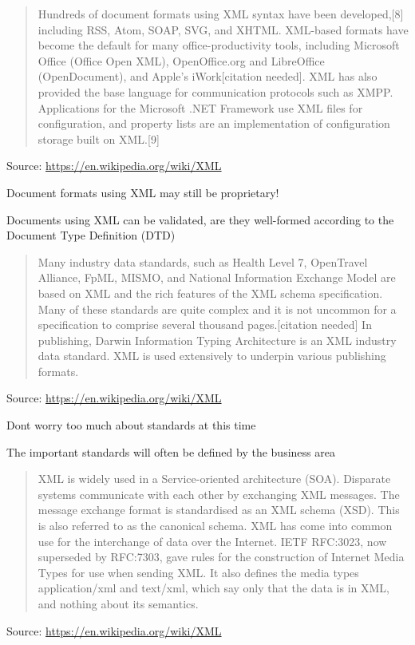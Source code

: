 \documentclass[Screen16to9,17pt]{foils}
\begin{document}
\begin{quote}
Hundreds of document formats using XML syntax have been developed,[8] including RSS, Atom, SOAP, SVG, and XHTML. XML-based formats have become the default for many office-productivity tools, including Microsoft Office (Office Open XML), OpenOffice.org and LibreOffice (OpenDocument), and Apple's iWork[citation needed]. XML has also provided the base language for communication protocols such as XMPP. Applications for the Microsoft .NET Framework use XML files for configuration, and property lists are an implementation of configuration storage built on XML.[9]
\end{quote}
Source: \url{https://en.wikipedia.org/wiki/XML}

\begin{list2}
\item Document formats using XML may still be proprietary!
\item Documents using XML can be validated, are they well-formed according to the Document Type Definition (DTD)
\end{list2}


\begin{quote}
Many industry data standards, such as Health Level 7, OpenTravel Alliance, FpML, MISMO, and National Information Exchange Model are based on XML and the rich features of the XML schema specification. Many of these standards are quite complex and it is not uncommon for a specification to comprise several thousand pages.[citation needed] In publishing, Darwin Information Typing Architecture is an XML industry data standard. XML is used extensively to underpin various publishing formats.
\end{quote}
Source: \url{https://en.wikipedia.org/wiki/XML}

\begin{list2}
\item Dont worry too much about standards at this time
\item The important standards will often be defined by the business area
\end{list2}



\begin{quote}
XML is widely used in a Service-oriented architecture (SOA). Disparate systems communicate with each other by exchanging XML messages. The message exchange format is standardised as an XML schema (XSD). This is also referred to as the canonical schema. XML has come into common use for the interchange of data over the Internet. IETF RFC:3023, now superseded by RFC:7303, gave rules for the construction of Internet Media Types for use when sending XML. It also defines the media types application/xml and text/xml, which say only that the data is in XML, and nothing about its semantics.
\end{quote}
Source: \url{https://en.wikipedia.org/wiki/XML}
\end{document}
